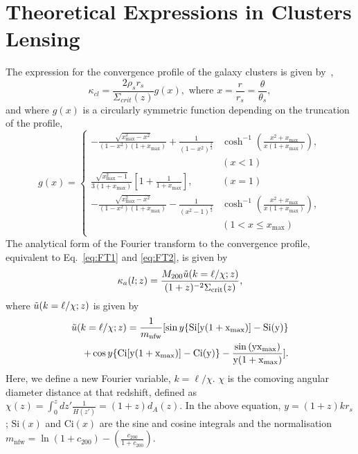\documentclass[prd, superscriptaddress, tightenlines, longbibliography, nofootinbib, eqsecnum, amsfonts, amsmath, floatfix, twocolumn, notitlepage]{revtex4-2}
\begin{document}
\section{Theoretical Expressions in Clusters Lensing}\label{A2}
The expression for the convergence profile of the galaxy clusters is given by~\cite{Takada:2002qq},
\begin{equation}
    \kappa_{cl} = \frac{2\rho_s r_s}{\Sigma_{crit}(z)}g(x), \text{ where } x=\frac{r}{r_s} = \frac{\theta}{\theta_s},
\end{equation}
and where $g(x)$ is a circularly symmetric function depending on the truncation of the profile,
\begin{equation}
    g(x) = 
     \begin{cases}
       -\frac{\sqrt{x_{\text{max}}^2-x^2}}{(1-x^2)(1+x_{\text{max}})} + \frac{1}{(1-x^2)^{\frac{3}{2}}}&\cosh^{-1}\left(\frac{x^2+x_{\text{max}}}{x(1+x_{\text{max}})}\right),  \\ &(x < 1)\\
       \frac{\sqrt{x_{\text{max}}^2 - 1}}{3(1+x_{\text{max}})}\left[ 1+\frac{1}{1+x_{\text{max}}} \right],  &(x = 1)\\
       -\frac{\sqrt{x_{\text{max}}^2-x^2}}{(1-x^2)(1+x_{\text{max}})} - \frac{1}{(x^2-1)^{\frac{3}{2}}}&\cosh^{-1}\left(\frac{x^2+x_{\text{max}}}{x(1+x_{\text{max}})}\right),  \\
       &(1< x \leq x_{\text{max}})\\
     \end{cases}
\end{equation}
The analytical form of the Fourier transform to the convergence profile, equivalent to Eq.~\ref{eq:FT1} and \ref{eq:FT2}, is given by \cite{Scoccimarro:2000gm, 2011PhRvD..83b3008O, Takada:2002qq}%
\begin{equation}\label{eq:ft_anal1}
    \kappa_{a}(l;z) = \frac{M_{200}\Tilde{u}(k=\ell/\chi;z)}{(1+z)^{-2}\Sigma_{\text{crit}}(z)},
\end{equation}
where $\Tilde{u}(k=\ell/\chi;z)$ is given by
\begin{align}\label{eq:ft_anal2}
    \Tilde{u}(k=\ell/\chi;z) = \frac{1}{m_{\text{nfw}}}[\sin{y}\{\text{Si}[y(1+x_{\text{max}})] -\text{Si}(y)\} \nonumber \\ 
    +\cos{y}\{ \text{Ci}[y(1+x_{\text{max}})]-\text{Ci}(y) \} - \frac{\sin{(y x_{\text{max}})}}{y(1+x_{\text{max}})}].
\end{align}
Here, we define a new Fourier variable, $k =\ell/\chi$. $\chi$ is the comoving angular diameter distance at that redshift, defined as $\chi(z) = \int_0^z dz'\frac{1}{H(z')} = (1+z)d_A(z)$. In the above equation, $y = (1+z)kr_s$; $\text{Si}(x)$ and $\text{Ci}(x)$ are the sine and cosine integrals and the normalisation $m_{\text{nfw}} = \ln{(1+c_{200})}-\left(\frac{c_{200}}{1+c_{200}}\right)$.
\end{document}
